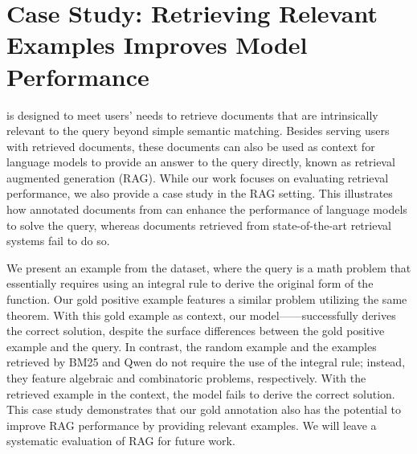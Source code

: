 \section{Case Study: Retrieving Relevant Examples Improves Model Performance}
\label{sec:case_study}
\ours is designed to meet users' needs to retrieve documents that are intrinsically relevant to the query beyond simple semantic matching. Besides serving users with retrieved documents, these documents can also be used as context for language models to provide an answer to the query directly, known as retrieval augmented generation (RAG). While our work focuses on evaluating retrieval performance, we also provide a case study in the RAG setting. This illustrates how annotated documents from \ours can enhance the performance of language models to solve the query, whereas documents retrieved from state-of-the-art retrieval systems fail to do so. 

We present an example from the \theorem dataset, where the query is a math problem that essentially requires using an integral rule to derive the original form of the function. 
Our gold positive example features a similar problem utilizing the same theorem. 
With this gold example as context, our model------successfully derives the correct solution, despite the surface differences between the gold positive example and the query. 
In contrast, the random example and the examples retrieved by BM25 and Qwen do not require the use of the integral rule; instead, they feature algebraic and combinatoric problems, respectively. 
With the retrieved example in the context, the model fails to derive the correct solution. 
This case study demonstrates that our gold annotation also has the potential to improve RAG performance by providing relevant examples. 
We will leave a systematic evaluation of RAG for future work. 




